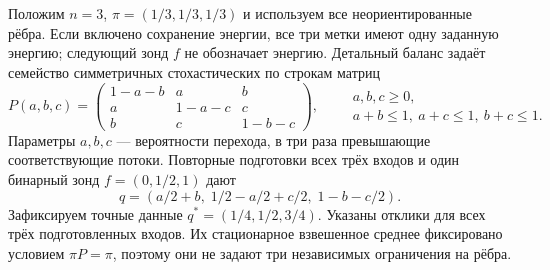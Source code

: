 \section{}
\label{sec:benchmark}
{Положим $n=3$, $\pi=(1/3,1/3,1/3)$ и используем все неориентированные рёбра. Если включено сохранение энергии, все три метки имеют одну заданную энергию; следующий зонд $f$ не обозначает энергию. Детальный баланс задаёт семейство симметричных стохастических по строкам матриц}
\begin{equation}\label{eq:matrix}
 P(a,b,c)=\begin{pmatrix}
 1-a-b&a&b\\a&1-a-c&c\\b&c&1-b-c
 \end{pmatrix},\qquad
 \begin{gathered}a,b,c\geq0,\\a+b\leq1,\ a+c\leq1,\ b+c\leq1.\end{gathered}
\end{equation}
{Параметры $a,b,c$ --- вероятности перехода, в три раза превышающие соответствующие потоки. Повторные подготовки всех трёх входов и один бинарный зонд $f=(0,1/2,1)$ дают}
\begin{equation}\label{eq:means}
 q=(a/2+b,\;1/2-a/2+c/2,\;1-b-c/2).
\end{equation}
{Зафиксируем точные данные $q^*=(1/4,1/2,3/4)$. Указаны отклики для всех трёх подготовленных входов. Их стационарное взвешенное среднее фиксировано условием $\pi P=\pi$, поэтому они не задают три независимых ограничения на рёбра.}

